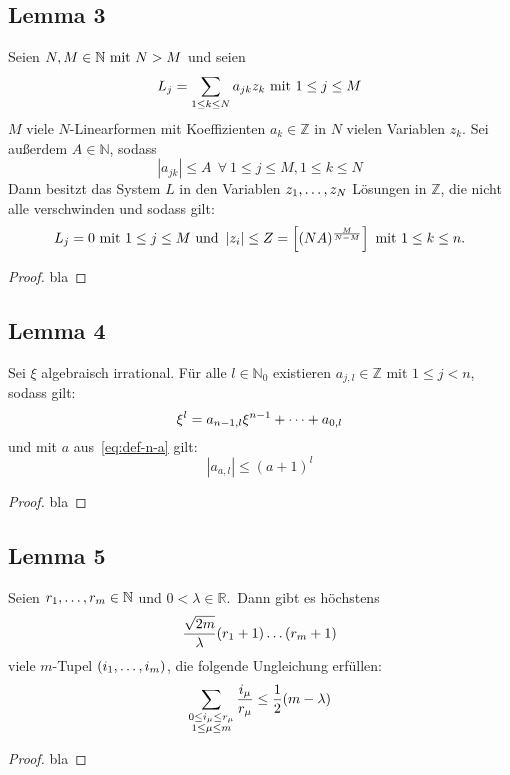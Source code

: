 
\subsection{Lemma 3}
    \label{subsec:lemma3}
    Seien $N, M \in \mathbb{N} \ \textrm{mit}\  N > M$ und seien
    \begin{equation*}
        L_j = \sum_{1 \leq k \leq N} a_{jk} z_k \ \textrm{mit}\  1 \leq j \leq M
    \end{equation*}
    $M$ viele $N$-Linearformen mit Koeffizienten $a_k \in \mathbb{Z}$ in $N$ vielen Variablen $z_k$.
    \textrm{Sei außerdem} $A \in \mathbb{N}$, sodass
    \begin{equation*}
        \left| a_{jk} \right| \leq A \ \ \forall \ 1 \leq j \leq M, 1 \leq k \leq N
    \end{equation*}
    \textrm{Dann besitzt das System $L$ in den Variablen $z_1, \dots, z_N$ Lösungen in $\mathbb{Z}$, die nicht alle
    verschwinden und sodass gilt:}
    \begin{equation*}
        L_j = 0 \ \textrm{mit}\  1 \leq j \leq M \ \textrm{und}\  \left| z_i \right| \leq Z = \left[ (NA)^{\frac{M}{N-M}} \right]
        \ \textrm{mit}\  1 \leq k \leq n.
    \end{equation*}
    \begin{proof}
        bla
    \end{proof}

\subsection{Lemma 4}
    \label{subsec:lemma4}
    \textrm{Sei $\xi$ algebraisch irrational. Für alle $l \in \mathbb{N}_0$ existieren $a_{j,l} \in \mathbb{Z}$ mit $1
    \leq j < n$, sodass gilt:}
    \begin{equation*}
        \xi^l = a_{n-1, l}\xi^{n-1} + \dots + a_{0,l}
    \end{equation*}
    und mit $a$ aus~\eqref{eq:def-n-a} gilt:
    \begin{equation*}
        \left| a_{a,l} \right| \leq (a + 1)^l
    \end{equation*}
    \begin{proof}
        bla
    \end{proof}

\subsection{Lemma 5}
    \label{subsec:lemma5}
    \textrm{Seien $r_1, \dots, r_m \in \mathbb{N}$ und $0 < \lambda \in \mathbb{R}$.\ Dann gibt es höchstens}
    \begin{equation*}
        \frac{\sqrt{2m}}{\lambda} (r_1 + 1) \dots (r_m +1)
    \end{equation*}
    \textrm{viele $m$-Tupel $(i_1, \dots, i_m)$, die folgende Ungleichung erfüllen:}
    \begin{equation*}
        \sum_{\substack{0 \leq i_\mu \leq r_\mu \\ 1 \leq \mu \leq m}} \frac{i_\mu}{r_\mu} \leq \frac{1}{2} (m - \lambda)
    \end{equation*}
    \begin{proof}
        bla
    \end{proof}
    
